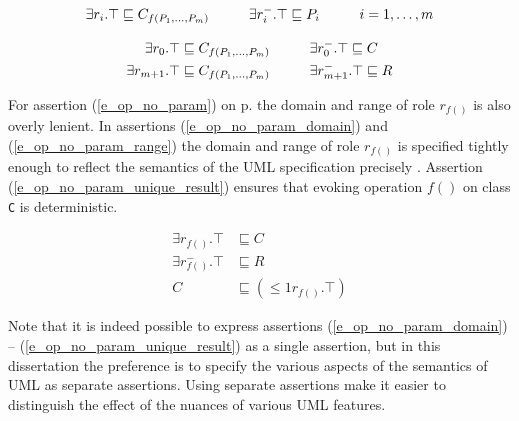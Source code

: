     \begin{equation} \label{e_op_param_types}
      \begin{split}  
  	\exists r_i.\top \sqsubseteq C_{f(P_1, ..., P_m)}   \hspace*{1cm}  \exists r_i^-.\top \sqsubseteq P_i \hspace*{1cm} i = 1, \ldots, m \\
      \end{split}
    \end{equation}

    \begin{equation} \label{e_op_return_type}
      \begin{split}
	\exists r_0.\top &\sqsubseteq C_{f(P_1, ..., P_m)}   \hspace*{1cm}  \exists r_0^-.\top \sqsubseteq C \\
	\exists r_{m+1}.\top &\sqsubseteq C_{f(P_1, ..., P_m)}   \hspace*{1cm}  \exists r_{m+1}^-.\top \sqsubseteq R
      \end{split}
    \end{equation}  
 
For assertion (\ref{e_op_no_param}) on p. \pageref{e_op_no_param} 
the domain and range of role $r_{f()}$ is also overly lenient. 
In assertions (\ref{e_op_no_param_domain}) and (\ref{e_op_no_param_range})
the domain and range of role $r_{f()}$ is specified tightly enough to reflect the 
semantics of the UML specification precisely \cite{ISO-UMLSuper2.4.1}. 
Assertion (\ref{e_op_no_param_unique_result})
ensures that evoking operation $f()$ on class \texttt{C} is deterministic.

    \begin{align} 
      \exists r_{f()}.\top & \sqsubseteq C \label{e_op_no_param_domain} \\
      \exists r_{f()}^-.\top & \sqsubseteq R \label{e_op_no_param_range} \\
      C &\sqsubseteq (\leq 1 r_{f()}.\top) \label{e_op_no_param_unique_result}
    \end{align}

Note that it is indeed possible to express assertions 
(\ref{e_op_no_param_domain}) -- (\ref{e_op_no_param_unique_result}) as a single assertion, 
but in this dissertation the preference is to specify the various aspects of the semantics
of UML as separate assertions. Using separate assertions make it easier to 
distinguish the effect of the nuances of various UML features.

